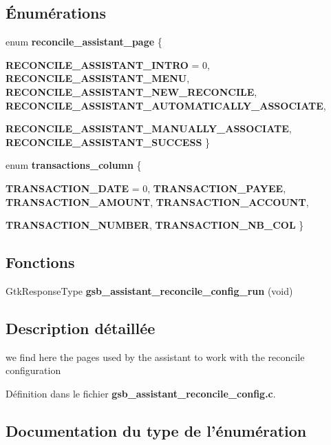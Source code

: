 \subsection*{Énumérations}
\begin{DoxyCompactItemize}
\item 
enum {\bf reconcile\_\-assistant\_\-page} \{ \par
{\bf RECONCILE\_\-ASSISTANT\_\-INTRO} =  0, 
{\bf RECONCILE\_\-ASSISTANT\_\-MENU}, 
{\bf RECONCILE\_\-ASSISTANT\_\-NEW\_\-RECONCILE}, 
{\bf RECONCILE\_\-ASSISTANT\_\-AUTOMATICALLY\_\-ASSOCIATE}, 
\par
{\bf RECONCILE\_\-ASSISTANT\_\-MANUALLY\_\-ASSOCIATE}, 
{\bf RECONCILE\_\-ASSISTANT\_\-SUCCESS}
 \}
\item 
enum {\bf transactions\_\-column} \{ \par
{\bf TRANSACTION\_\-DATE} =  0, 
{\bf TRANSACTION\_\-PAYEE}, 
{\bf TRANSACTION\_\-AMOUNT}, 
{\bf TRANSACTION\_\-ACCOUNT}, 
\par
{\bf TRANSACTION\_\-NUMBER}, 
{\bf TRANSACTION\_\-NB\_\-COL}
 \}
\end{DoxyCompactItemize}
\subsection*{Fonctions}
\begin{DoxyCompactItemize}
\item 
GtkResponseType {\bf gsb\_\-assistant\_\-reconcile\_\-config\_\-run} (void)
\end{DoxyCompactItemize}


\subsection{Description détaillée}
we find here the pages used by the assistant to work with the reconcile configuration 

Définition dans le fichier {\bf gsb\_\-assistant\_\-reconcile\_\-config.c}.



\subsection{Documentation du type de l'énumération}
